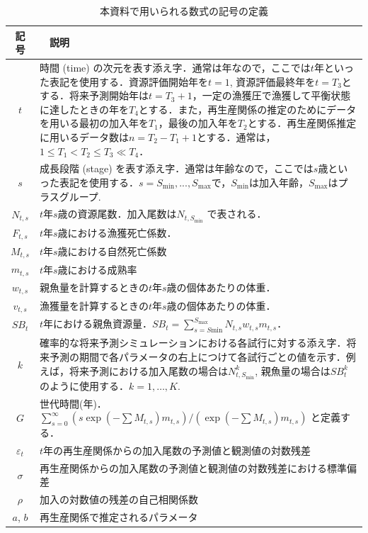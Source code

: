 \documentclass[11pt]{jsarticle}
\begin{document}
\begin{table}[h]
  \begin{tabular}{cp{14cm}} \hline
    記号    & 　説明 \\ \hline
    $t$ & 時間 (time) の次元を表す添え字．通常は年なので，ここでは$t$年といった表記を使用する．資源評価開始年を$t=1$, 資源評価最終年を$t=T_3$とする．将来予測開始年は$t=T_{3}+1$，一定の漁獲圧で漁獲して平衡状態に達したときの年を$T_4$とする．また，再生産関係の推定のためにデータを用いる最初の加入年を$T_1$，最後の加入年を$T_2$とする．再生産関係推定に用いるデータ数は$n=T_2-T_1+1$とする．通常は，$1 \leq T_1 < T_2 \leq T_3 \ll T_4$．\\
    $s$ & 成長段階 (stage) を表す添え字．通常は年齢なので，ここでは$s$歳といった表記を使用する．$s=S_{\mathrm{min}},...,S_{\mathrm{max}}$で，$S_{\mathrm{min}}$は加入年齢，$S_{\mathrm{max}}$はプラスグループ.\\ %
    $N_{t,s}$ & $t$年$s$歳の資源尾数．加入尾数は$N_{t,S_{\mathrm{min}}}$ で表される．\\
    $F_{t,s}$ & $t$年$s$歳における漁獲死亡係数．\\
    $M_{t,s}$ & $t$年$s$歳における自然死亡係数\\
    $m_{t,s}$ & $t$年$s$歳における成熟率\\
    $w_{t,s}$ & 親魚量を計算するときの$t$年$s$歳の個体あたりの体重．\\
    $v_{t,s}$ & 漁獲量を計算するときの$t$年$s$歳の個体あたりの体重．\\ %
    $S\!B_{t} $ & $t$年における親魚資源量．$S\!B_t=\sum_{s=S\mathrm{min}}^{S_{\mathrm{max}}}N_{t,s} w_{t,s} m_{t,s}$．\\
    $k$      & 確率的な将来予測シミュレーションにおける各試行に対する添え字．将来予測の期間で各パラメータの右上につけて各試行ごとの値を示す．例えば，将来予測における加入尾数の場合は$N_{t,S_{\mathrm{min}}}^k$, 親魚量の場合は$S\!B_t^k$のように使用する．$k=1,…,K$.\\
    $G$       & 世代時間(年)．$\sum_{s=0}^\infty (s \exp(-\sum M_{t,s}) m_{t, s})/(\exp(-\sum M_{t,s}) m_{t,s})$ と定義する．\\ %
    $\varepsilon_t$  & $t$年の再生産関係からの加入尾数の予測値と観測値の対数残差\\
    $\sigma$  & 再生産関係からの加入尾数の予測値と観測値の対数残差における標準偏差\\
    $\rho$  & 加入の対数値の残差の自己相関係数\\
    $a$, $b$  & 再生産関係で推定されるパラメータ\\ \hline  %
  \end{tabular}
  \caption{本資料で用いられる数式の記号の定義}
  \label{table_definition} 
\end{table}
\end{document}
